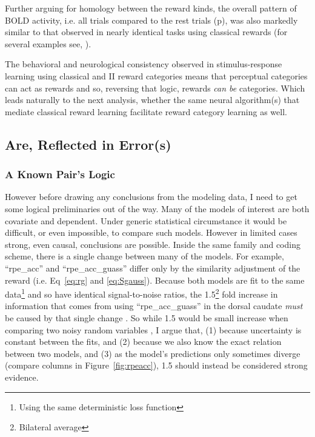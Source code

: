 \documentclass[doc,12pt]{apa}        %
\begin{document}
Further arguing for homology between the reward kinds, the overall pattern of BOLD activity, i.e. all trials compared to the rest trials (p\pageref{sub:blob}), was also markedly similar to that observed in nearly identical tasks using classical rewards (for several examples see, ).

The behavioral and neurological consistency observed in stimulus-response learning using classical and II reward categories means that perceptual categories can act as rewards and so, reversing that logic, rewards \emph{can be} categories.   Which leads naturally to the next analysis, whether the same neural algorithm(s) that mediate classical reward learning facilitate reward category learning as well.

\subsection{Are, Reflected in Error(s)}
\label{sub:inerror}
\subsubsection{A Known Pair's Logic}
\label{subsub:onestep}
However before drawing any conclusions from the modeling data, I need to get some logical preliminaries out of the way.  Many of the models of interest are both covariate and dependent.  Under generic statistical circumstance it would be difficult, or even impossible, to compare such models.  However in limited cases strong, even causal, conclusions are possible.   Inside the same family and coding scheme, there is a single change between many of the models.  For example, ``rpe\_acc'' and ``rpe\_acc\_guass'' differ only by the similarity adjustment of the reward (i.e. Eq~\ref{eq:rg} and \ref{eq:Sgauss}).  Because both models are fit to the same data\footnote{Using the same deterministic loss function} and so have identical signal-to-noise ratios, the 1.5\footnote{Bilateral average} fold increase in information that comes from using ``rpe\_acc\_guass'' in the dorsal caudate \emph{must} be caused by that single change \cite{Pearl:2010p9726}.  So while 1.5 would be small increase when comparing two noisy random variables \cite{Anderson:2000p9475,Forster:2000p9623}, I argue that, (1) because uncertainty is constant between the fits, and (2) because we also know the exact relation between two models, and (3) as the model's predictions only sometimes diverge (compare columns in Figure~\ref{fig:rpeacc}), 1.5 should instead be considered strong evidence.
\end{document}
